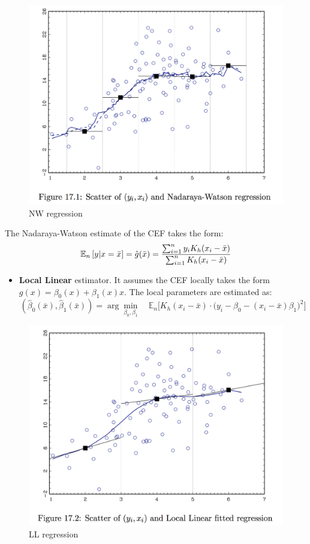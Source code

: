 \documentclass[12pt,]{book}
\providecommand{\tightlist}{%
  \setlength{\itemsep}{0pt}\setlength{\parskip}{0pt}}
\begin{document}
\begin{figure}
\centering
\includegraphics{figures/Fig_521.png}
\caption{NW regression}
\end{figure}

The Nadaraya-Watson estimate of the CEF takes the form:
\[
    \mathbb E_n \left[ y | x = \bar{x}\right] = \hat{g}(\bar{x}) = \frac{\sum_{i=1}^n y_i K_h (x_i - \bar{x})}{\sum_{i=1}^n K_h (x_i - \bar{x})} \\
\]

\begin{itemize}
\tightlist
\item
  \textbf{Local Linear} estimator. It assumes the CEF locally takes the form \(g(x) = \beta_0(x) + \beta_1(x) x\). The local parameters are estimated as:
  \[
  \left( \hat{\beta}_0 (\bar{x}), \hat{\beta}_1 (\bar{x}) \right) = \arg\min_{\beta_0, \beta_1}  \quad   \mathbb E_n \Big[ K_h (x_i - \bar{x}) \cdot  \big(y_i - \beta_0 - (x_i - \bar{x}) \beta_1 \big)^2 \Big]
  \]
\end{itemize}

\begin{figure}
\centering
\includegraphics{figures/Fig_522.png}
\caption{LL regression}
\end{figure}
\end{document}
